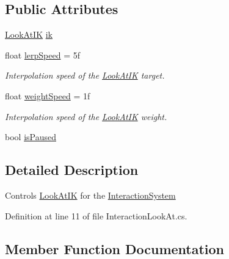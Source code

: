 \subsection*{Public Attributes}
\begin{DoxyCompactItemize}
\item 
\mbox{\hyperlink{class_root_motion_1_1_final_i_k_1_1_look_at_i_k}{Look\+At\+IK}} \mbox{\hyperlink{class_root_motion_1_1_final_i_k_1_1_interaction_look_at_a98b9362ec5e11830c11f438a7f287ba8}{ik}}
\item 
float \mbox{\hyperlink{class_root_motion_1_1_final_i_k_1_1_interaction_look_at_ac2663e9992461e3f251e04d5aad251ab}{lerp\+Speed}} = 5f
\begin{DoxyCompactList}\small\item\em Interpolation speed of the \mbox{\hyperlink{class_root_motion_1_1_final_i_k_1_1_look_at_i_k}{Look\+At\+IK}} target. \end{DoxyCompactList}\item 
float \mbox{\hyperlink{class_root_motion_1_1_final_i_k_1_1_interaction_look_at_a243f6344a62b65c07dd93bf99b0677da}{weight\+Speed}} = 1f
\begin{DoxyCompactList}\small\item\em Interpolation speed of the \mbox{\hyperlink{class_root_motion_1_1_final_i_k_1_1_look_at_i_k}{Look\+At\+IK}} weight. \end{DoxyCompactList}\item 
bool \mbox{\hyperlink{class_root_motion_1_1_final_i_k_1_1_interaction_look_at_a2f6103364959fa4e38f6f383c55776a2}{is\+Paused}}
\end{DoxyCompactItemize}


\subsection{Detailed Description}
Controls \mbox{\hyperlink{class_root_motion_1_1_final_i_k_1_1_look_at_i_k}{Look\+At\+IK}} for the \mbox{\hyperlink{class_root_motion_1_1_final_i_k_1_1_interaction_system}{Interaction\+System}} 



Definition at line 11 of file Interaction\+Look\+At.\+cs.



\subsection{Member Function Documentation}
\mbox{\label{class_root_motion_1_1_final_i_k_1_1_interaction_look_at_ab53fdc5347fdc87d0179f420d0db33fd}} 
